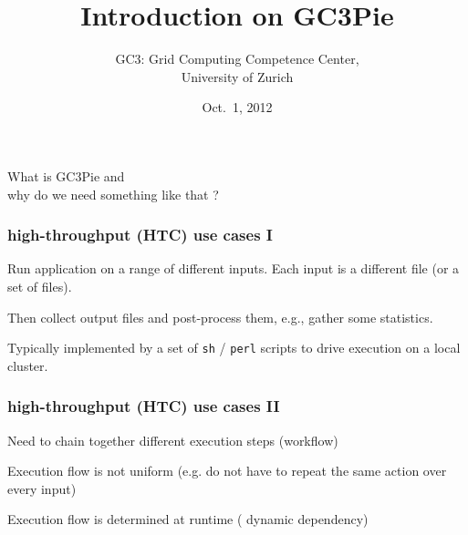 \documentclass[english,serif,mathserif,xcolor=pdftex,dvipsnames,table]{beamer}
\title[Introduction on GC3Pie]{%
  Introduction on GC3Pie
}
\author[Sergio Maffioletti]{%
  GC3: Grid Computing Competence Center, \\
  University of Zurich
}
\date{Oct.~1, 2012}
\begin{document}
\maketitle



\begin{frame}
  \begin{center}
    \huge{What is {\color{Blue} GC3Pie} and \\ why do we need something like that ?}
  \end{center}
\end{frame}

\begin{frame}
  \frametitle{high-throughput (HTC) use cases I}
  
  \begin{block}{}
    Run application on a {\color{Blue} range} of different inputs.
    Each input is a different file (or a set of files).
  \end{block}
    
  \begin{block}{}
    Then {\color{Blue} collect} output files and post-process them, e.g., gather some
    statistics.
  \end{block}

  \begin{block}{}
    Typically implemented by a set of \texttt{sh} / \texttt{perl} scripts to drive
    execution on a local cluster.
  \end{block}
\end{frame}

\begin{frame}
  \frametitle{high-throughput (HTC) use cases II}

  \begin{block}{}
    Need to {\color{Blue} chain together} different execution steps
    (workflow)
  \end{block}

  \begin{block}{}
    Execution flow is not {\color{Blue} uniform} (e.g. do not have to
    repeat the same action over every input)
  \end{block}

  \begin{block}{}
    Execution flow is determined at runtime ({\color{Blue} dynamic
    dependency})
  \end{block}

\end{frame}
\end{document}
